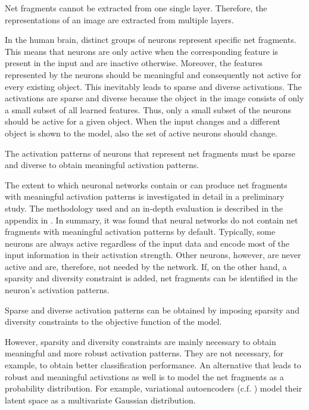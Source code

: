 \begin{implementation}
	Net fragments cannot be extracted from one single layer. Therefore, the representations of an image are extracted from multiple layers.
\end{implementation}

In the human brain, distinct groups of neurons represent specific net fragments.
This means that neurons are only active when the corresponding feature is present in the input and are inactive otherwise.
Moreover, the features represented by the neurons should be meaningful and consequently not active for every existing object.
This inevitably leads to sparse and diverse activations.
The activations are sparse and diverse because the object in the image consists of only a small subset of all learned features. Thus, only a small subset of the neurons should be active for a given object.
When the input changes and a different object is shown to the model, also the set of active neurons should change.

\begin{claim}
	The activation patterns of neurons that represent net fragments must be sparse and diverse to obtain meaningful activation patterns.
\end{claim}

The extent to which neuronal networks contain or can produce net fragments with meaningful activation patterns is investigated in detail in a preliminary study.
The methodology used and an in-depth evaluation is described in the appendix in .
In summary, it was found that neural networks do not contain net fragments with meaningful activation patterns by default. Typically, some neurons are always active regardless of the input data and encode most of the input information in their activation strength.
Other neurons, however, are never active and are, therefore, not needed by the network.
If, on the other hand, a sparsity and diversity constraint is added, net fragments can be identified in the neuron's activation patterns.

\begin{implementation}
	Sparse and diverse activation patterns can be obtained by imposing sparsity and diversity constraints to the objective function of the model.
\end{implementation}

However, sparsity and diversity constraints are mainly necessary to obtain meaningful and more robust activation patterns.
They are not necessary, for example,  to obtain better classification performance.
An alternative that leads to robust and meaningful activations as well is to model the net fragments as a probability distribution.
For example, variational autoencoders (c.f. ) model their latent space as a multivariate Gaussian distribution.

